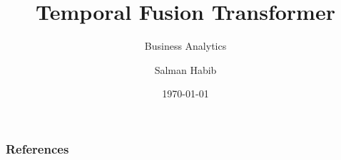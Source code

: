 \documentclass[10pt, a4paper]{beamer}
\title{Temporal Fusion Transformer}
\subtitle{Business Analytics}
\author{Salman Habib \\ 
	   }
\date{\today}
\begin{document}











\begin{frame}[allowframebreaks]
	\frametitle{References}
\printbibliography
\end{frame}

\end{document}
